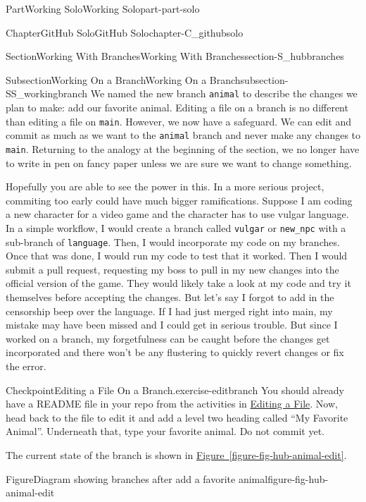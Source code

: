 \documentclass[oneside,10pt,]{book}
\newcommand{\xreffont}{\relax}
\newcommand{\mono}[1]{\texttt{#1}}
\begin{document}
\begin{partptx}{Part}{Working Solo}{}{Working Solo}{}{}{part-part-solo}
\begin{chapterptx}{Chapter}{GitHub Solo}{}{GitHub Solo}{}{}{chapter-C_githubsolo}
\begin{sectionptx}{Section}{Working With Branches}{}{Working With Branches}{}{}{section-S_hubbranches}
%
\begin{subsectionptx}{Subsection}{Working On a Branch}{}{Working On a Branch}{}{}{subsection-SS_workingbranch}
%
We named the new branch \mono{animal} to describe the changes we plan to make: add our favorite animal. Editing a file on a branch is no different than editing a file on \mono{main}. However, we now have a safeguard. We can edit and commit as much as we want to the \mono{animal} branch and never make any changes to \mono{main}. Returning to the analogy at the beginning of the section, we no longer have to write in pen on fancy paper unless we are sure we want to change something.%
\par
Hopefully you are able to see the power in this. In a more serious project, commiting too early could have much bigger ramifications. Suppose I am coding a new character for a video game and the character has to use vulgar language. In a simple workflow, I would create a branch called \mono{vulgar} or \mono{new\_npc} with a sub-branch of \mono{language}. Then, I would incorporate my code on my branches. Once that was done, I would run my code to test that it worked. Then I would submit a pull request, requesting my boss to pull in my new changes into the official version of the game. They would likely take a look at my code and try it themselves before accepting the changes. But let's say I forgot to add in the censorship beep over the language. If I had just merged right into main, my mistake may have been missed and I could get in serious trouble. But since I worked on a branch, my forgetfulness can be caught before the changes get incorporated and there won't be any flustering to quickly revert changes or fix the error.%
\begin{inlineexercise}{Checkpoint}{Editing a File On a Branch.}{exercise-editbranch}%
You should already have a README file in your repo from the activities in \hyperref[subsection-hub-editfile]{Editing a File}. Now, head back to the file to edit it and add a level two heading called ``My Favorite Animal''. Underneath that, type your favorite animal. Do not commit yet.%
\par
The current state of the branch is shown in \hyperref[figure-fig-hub-animal-edit]{Figure~{\xreffont\ref{figure-fig-hub-animal-edit}}}.%
\end{inlineexercise}%
\begin{figureptx}{Figure}{Diagram showing branches after add a favorite animal}{figure-fig-hub-animal-edit}{}%
\begin{image}{0}{1}{0}{}%

\end{image}
\end{figureptx}
\end{subsectionptx}
\end{sectionptx}
\end{chapterptx}
\end{partptx}
\end{document}
